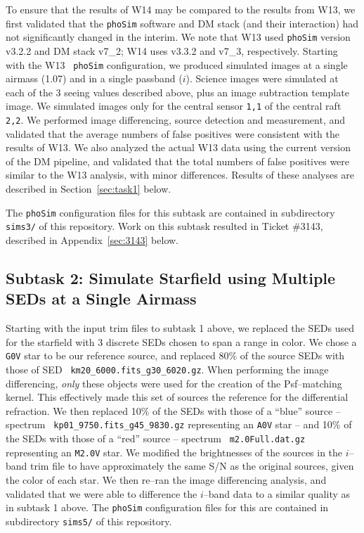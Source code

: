 \documentclass[DM,toc]{lsstdoc}
\begin{document}
To ensure that the results of W14 may be compared to the results from
W13, we first validated that the {\tt phoSim} software and DM stack
(and their interaction) had not significantly changed in the interim.
We note that W13 used {\tt phoSim} version v3.2.2 and DM stack v7\_2;
W14 uses v3.3.2 and v7\_3, respectively.  Starting with the W13 {\tt
  phoSim} configuration, we produced simulated images at a single
airmass (1.07) and in a single passband ($i$).  Science images were
simulated at each of the 3 seeing values described above, plus an
image subtraction template image.  We simulated images only for the
central sensor {\tt 1,1} of the central raft {\tt 2,2}.  We performed
image differencing, source detection and measurement, and validated
that the average numbers of false positives were consistent with the
results of W13.  We also analyzed the actual W13 data using the
current version of the DM pipeline, and validated that the total
numbers of false positives were similar to the W13 analysis, with
minor differences.  Results of these analyses are described in
Section~\ref{sec:task1} below.

The {\tt phoSim} configuration files for this subtask are contained in
subdirectory {\tt sims3/} of this repository.  Work on this subtask
resulted in Ticket \#3143, described in Appendix~\ref{sec:3143} below.

\subsection{Subtask 2: Simulate Starfield using Multiple SEDs at a Single Airmass}

Starting with the input trim files to subtask 1 above, we replaced the
SEDs used for the starfield with 3 discrete SEDs chosen to span a
range in color.  We chose a {\tt G0V} star to be our reference source,
and replaced 80\% of the source SEDs with those of SED {\tt
  km20\_6000.fits\_g30\_6020.gz}.  When performing the image
differencing, {\it only} these objects were used for the creation of
the Psf--matching kernel.  This effectively made this set of sources
the reference for the differential refraction.  We then replaced 10\%
of the SEDs with those of a ``blue'' source -- spectrum {\tt
  kp01\_9750.fits\_g45\_9830.gz} representing an {\tt A0V} star -- and
10\% of the SEDs with those of a ``red'' source -- spectrum {\tt
  m2.0Full.dat.gz} representing an {\tt M2.0V} star.  We modified the
brightnesses of the sources in the $i$--band trim file to have
approximately the same S/N as the original sources, given the color of
each star.  We then re--ran the image differencing analysis, and
validated that we were able to difference the $i$--band data to a
similar quality as in subtask 1 above.  The {\tt phoSim} configuration
files for this are contained in subdirectory {\tt sims5/} of this
repository.
\end{document}
